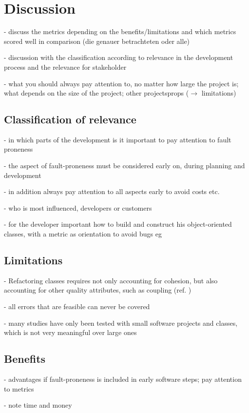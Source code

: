\section{Discussion}\label{discussion}

- discuss the metrics depending on the benefits/limitations and which metrics scored well in comparison (die genauer betrachteten oder alle)

- discussion with the classification according to relevance in the development process and the relevance for stakeholder

- what you should always pay attention to, no matter how large the project is; what depends on the size of the project; other projectsprops ($\rightarrow$ limitations)


\subsection{Classification of relevance}

- in which parts of the development is it important to pay attention to fault proneness

- the aspect of fault-proneness must be considered early on, during planning and development

- in addition always pay attention to all aspects early to avoid costs etc.

- who is most influenced, developers or customers

- for the developer important how to build and construct his object-oriented classes, with a metric as orientation to avoid bugs eg

\subsection{Limitations}

- Refactoring classes requires not only accounting for cohesion, but also accounting for other quality attributes, such as coupling (ref. \cite{b8al2012precise})

- all errors that are feasible can never be covered
 
- many studies have only been tested with small software projects and classes, which is not very meaningful over large ones

\subsection{Benefits}

- advantages if fault-proneness is included in early software steps; pay attention to metrics

- note time and money